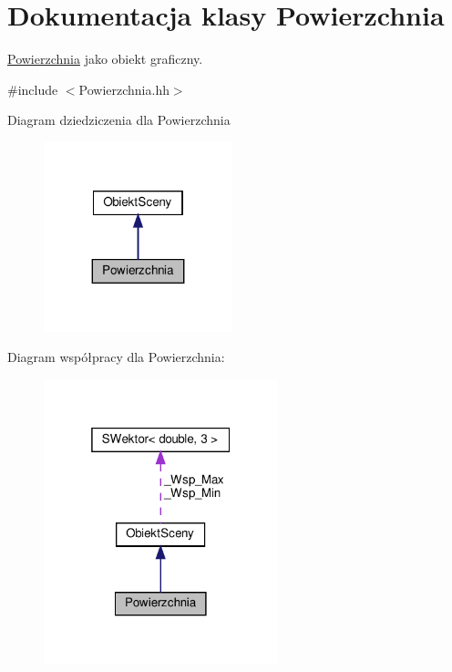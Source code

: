 \hypertarget{classPowierzchnia}{}\section{Dokumentacja klasy Powierzchnia}
\label{classPowierzchnia}


\hyperlink{classPowierzchnia}{Powierzchnia} jako obiekt graficzny.  




{\ttfamily \#include $<$Powierzchnia.\+hh$>$}



Diagram dziedziczenia dla Powierzchnia
\nopagebreak
\begin{figure}[H]
\begin{center}
\leavevmode
\includegraphics[width=155pt]{classPowierzchnia__inherit__graph}
\end{center}
\end{figure}


Diagram współpracy dla Powierzchnia\+:
\nopagebreak
\begin{figure}[H]
\begin{center}
\leavevmode
\includegraphics[width=193pt]{classPowierzchnia__coll__graph}
\end{center}
\end{figure}
